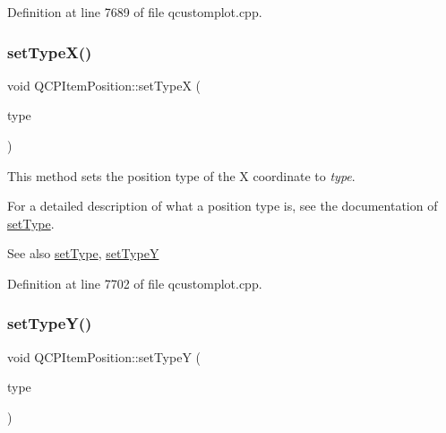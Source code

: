 Definition at line 7689 of file qcustomplot.\+cpp.

\mbox{\label{class_q_c_p_item_position_a2113b2351d6d00457fb3559a4e20c3ea}} 
\subsubsection{\texorpdfstring{set\+Type\+X()}{setTypeX()}}
{\footnotesize\ttfamily void Q\+C\+P\+Item\+Position\+::set\+TypeX (\begin{DoxyParamCaption}\item[{\hyperlink{class_q_c_p_item_position_aad9936c22bf43e3d358552f6e86dbdc8}{Q\+C\+P\+Item\+Position\+::\+Position\+Type}}]{type }\end{DoxyParamCaption})}

This method sets the position type of the X coordinate to {\itshape type}.

For a detailed description of what a position type is, see the documentation of \hyperlink{class_q_c_p_item_position_aa476abf71ed8fa4c537457ebb1a754ad}{set\+Type}.

\begin{DoxySeeAlso}{See also}
\hyperlink{class_q_c_p_item_position_aa476abf71ed8fa4c537457ebb1a754ad}{set\+Type}, \hyperlink{class_q_c_p_item_position_ac2a454aa5a54c1615c50686601ec4510}{set\+TypeY} 
\end{DoxySeeAlso}


Definition at line 7702 of file qcustomplot.\+cpp.

\mbox{\label{class_q_c_p_item_position_ac2a454aa5a54c1615c50686601ec4510}} 
\subsubsection{\texorpdfstring{set\+Type\+Y()}{setTypeY()}}
{\footnotesize\ttfamily void Q\+C\+P\+Item\+Position\+::set\+TypeY (\begin{DoxyParamCaption}\item[{\hyperlink{class_q_c_p_item_position_aad9936c22bf43e3d358552f6e86dbdc8}{Q\+C\+P\+Item\+Position\+::\+Position\+Type}}]{type }\end{DoxyParamCaption})}

